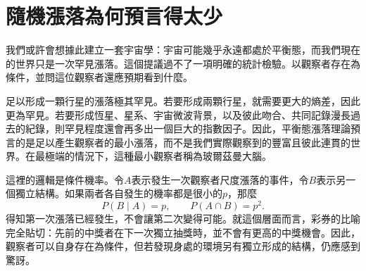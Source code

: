 \begin{classroomqa}
\end{classroomqa}

\begin{classroomqa}
\end{classroomqa}

\section{隨機漲落為何預言得太少}

我們或許會想據此建立一套宇宙學：宇宙可能幾乎永遠都處於平衡態，而我們現在的世界只是一次罕見漲落。這個提議過不了一項明確的統計檢驗。以觀察者存在為條件，並問這位觀察者還應預期看到什麼。

足以形成一顆行星的漲落極其罕見。若要形成兩顆行星，就需要更大的熵差，因此更為罕見。若要形成恆星、星系、宇宙微波背景，以及彼此吻合、共同記錄漫長過去的紀錄，則罕見程度還會再多出一個巨大的指數因子。因此，平衡態漲落理論預言的是足以產生觀察者的最小漲落，而不是我們實際觀察到的豐富且彼此連貫的世界。在最極端的情況下，這種最小觀察者稱為玻爾茲曼大腦。

這裡的邏輯是條件機率。令\(A\)表示發生一次觀察者尺度漲落的事件，令\(B\)表示另一個獨立結構。如果兩者各自發生的機率都是很小的\(p\)，那麼
\begin{equation}
 P(B\mid A)=p,
 \qquad
 P(A\cap B)=p^2.
 \label{eq:sm8-conditional-fluctuations}
\end{equation}
得知第一次漲落已經發生，不會讓第二次變得可能。就這個層面而言，彩券的比喻完全貼切：先前的中獎者在下一次獨立抽獎時，並不會有更高的中獎機會。因此，觀察者可以自身存在為條件，但若發現身處的環境另有獨立形成的結構，仍應感到驚訝。

\begin{classroomqa}
\end{classroomqa}

